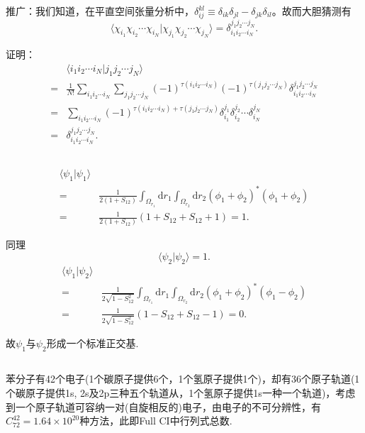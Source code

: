 \documentclass[UTF8]{ctexart}
\newcommand\diff[1]{\mathrm{d}#1}
\begin{document}
		推广：我们知道，在平直空间张量分析中，$\delta_{ij}^{kl} \equiv \delta_{ik}\delta_{jl} - \delta_{jk}\delta_{il}$。故而大胆猜测有
		\[
			\langle \chi_{i_1} \chi_{i_2} \cdots \chi_{i_N} | \chi_{j_1} \chi_{j_2} \cdots \chi_{j_N} \rangle = \delta_{i_1i_2\cdots i_N}^{j_1j_2\cdots j_N}.
		\]
		
		证明：
		\[
		\begin{aligned}
			&\langle i_1i_2\cdots i_N | j_1j_2 \cdots j_N \rangle \\
			=& \frac{1}{N!} \sum_{i_1i_2\cdots i_N}\sum_{j_1j_2 \cdots j_N} (-1)^{ \tau(i_1i_2\cdots i_N) } (-1)^{ \tau(j_1j_2 \cdots j_N) } \delta_{i_1i_2\cdots i_N}^{j_1j_2 \cdots j_N} \\
			=& \sum_{i_1i_2\cdots i_N} (-1)^{ \tau(i_1i_2\cdots i_N) + \tau(j_1j_2 \cdots j_N) } \delta_{i_1}^{j_1} \delta_{i_2}^{j_2} \cdots \delta_{i_N}^{j_N} \\
			=& \delta_{i_1i_2\cdots i_N}^{j_1j_2 \cdots j_N}.
		\end{aligned}
		\]
	
	\subsection{}
		\[
		\begin{aligned}
			\langle \psi_1 | \psi_1 \rangle \\
			=& \frac{1}{ 2(1 + S_{12}) } \int_{\Omega_{r_1}} \diff r_1 \int_{\Omega_{r_2}} \diff r_2 ( \phi_1 + \phi_2 )^* ( \phi_1 + \phi_2 ) \\
			=& \frac{1}{ 2(1 + S_{12}) } ( 1 + S_{12} + S_{12} + 1 ) = 1.
		\end{aligned}
		\]
		
		同理
		\[
			\langle \psi_2 | \psi_2 \rangle = 1.
		\]
		\[
		\begin{aligned}
		\langle \psi_1 | \psi_2 \rangle \\
		=& \frac{1}{ 2\sqrt{ 1 - S_{12}^2 } } \int_{\Omega_{r_1}} \diff r_1 \int_{\Omega_{r_2}} \diff r_2 ( \phi_1 + \phi_2 )^* ( \phi_1 - \phi_2 ) \\
		=& \frac{1}{ 2\sqrt{ 1 - S_{12}^2 } } ( 1 - S_{12} + S_{12} - 1 ) = 0.
		\end{aligned}
		\]
		
		故$\psi_1$与$\psi_2$形成一个标准正交基.
		
	
	\subsection{}
		苯分子有42个电子(1个碳原子提供6个，1个氢原子提供1个)，却有36个原子轨道(1个碳原子提供1s, 2s及2p三种五个轨道从，1个氢原子提供1s一种一个轨道)，考虑到一个原子轨道可容纳一对(自旋相反的)电子，由电子的不可分辨性，有$C_{72}^{42} = 1.64 \times 10^{20}$种方法，此即Full CI中行列式总数.
		
\end{document}
